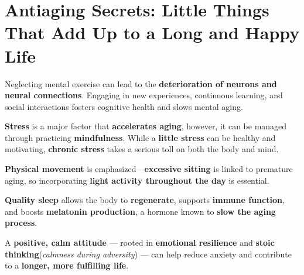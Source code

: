 \section*{Antiaging Secrets: Little Things That Add Up to a Long and Happy Life}

Neglecting mental exercise can lead to the \textbf{deterioration of neurons and neural connections}. Engaging in new experiences, continuous learning, and social interactions fosters cognitive health and slows mental aging. 

\textbf{Stress} is a major factor that \textbf{accelerates aging}, however, it can be managed through practicing \textbf{mindfulness}. While a \textbf{little stress} can be healthy and motivating, \textbf{chronic stress} takes a serious toll on both the body and mind.

\textbf{Physical movement} is emphasized—\textbf{excessive sitting} is linked to premature aging, so incorporating \textbf{light activity throughout the day} is essential. 

\textbf{Quality sleep} allows the body to \textbf{regenerate}, supports \textbf{immune function}, and boosts \textbf{melatonin production}, a hormone known to \textbf{slow the aging process}. 

A \textbf{positive, calm attitude} — rooted in \textbf{emotional resilience} and \textbf{stoic thinking}(\textit{calmness during adversity}) — can help reduce anxiety and contribute to a \textbf{longer, more fulfilling life}.

